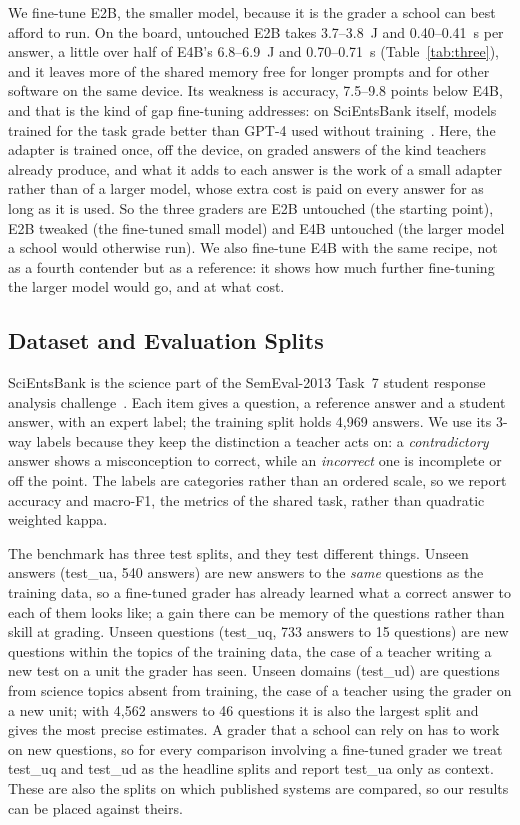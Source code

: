 \documentclass[journal]{IEEEtran}
\begin{document}
We fine-tune E2B, the smaller model, because it is the grader a school can best afford to run.
On the board, untouched E2B takes 3.7--3.8~J and 0.40--0.41~s per answer, a little over half of E4B's 6.8--6.9~J and 0.70--0.71~s (Table~\ref{tab:three}), and it leaves more of the shared memory free for longer prompts and for other software on the same device.
Its weakness is accuracy, 7.5--9.8 points below E4B, and that is the kind of gap fine-tuning addresses: on SciEntsBank itself, models trained for the task grade better than GPT-4 used without training~\cite{kortemeyer2024gpt4}. Here, the adapter is trained once, off the device, on graded answers of the kind teachers already produce, and what it adds to each answer is the work of a small adapter rather than of a larger model, whose extra cost is paid on every answer for as long as it is used.
So the three graders are E2B untouched (the starting point), E2B tweaked (the fine-tuned small model) and E4B untouched (the larger model a school would otherwise run).
We also fine-tune E4B with the same recipe, not as a fourth contender but as a reference: it shows how much further fine-tuning the larger model would go, and at what cost.

\subsection{Dataset and Evaluation Splits}
\label{sec:splits}
SciEntsBank is the science part of the SemEval-2013 Task~7 student response analysis challenge~\cite{dzikovska2013semeval}.
Each item gives a question, a reference answer and a student answer, with an expert label; the training split holds 4{,}969 answers.
We use its 3-way labels because they keep the distinction a teacher acts on: a \textit{contradictory} answer shows a misconception to correct, while an \textit{incorrect} one is incomplete or off the point. The labels are categories rather than an ordered scale, so we report accuracy and macro-F1, the metrics of the shared task, rather than quadratic weighted kappa.

The benchmark has three test splits, and they test different things.
Unseen answers (test\_ua, 540 answers) are new answers to the \textit{same} questions as the training data, so a fine-tuned grader has already learned what a correct answer to each of them looks like; a gain there can be memory of the questions rather than skill at grading.
Unseen questions (test\_uq, 733 answers to 15 questions) are new questions within the topics of the training data, the case of a teacher writing a new test on a unit the grader has seen.
Unseen domains (test\_ud) are questions from science topics absent from training, the case of a teacher using the grader on a new unit; with 4{,}562 answers to 46 questions it is also the largest split and gives the most precise estimates.
A grader that a school can rely on has to work on new questions, so for every comparison involving a fine-tuned grader we treat test\_uq and test\_ud as the headline splits and report test\_ua only as context.
These are also the splits on which published systems are compared, so our results can be placed against theirs.
\end{document}

